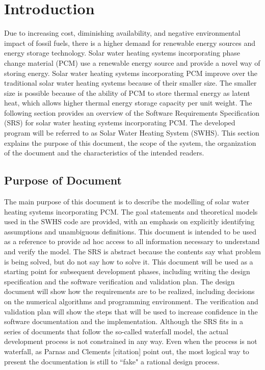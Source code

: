 \documentclass[12pt]{article}
\begin{document}
\section{Introduction}
\label{Sec:I}
Due to increasing cost, diminishing availability, and negative environmental impact of fossil fuels, there is a higher demand for renewable energy sources and energy storage technology. Solar water heating systems incorporating phase change material (PCM) use a renewable energy source and provide a novel way of storing energy. Solar water heating systems incorporating PCM improve over the traditional solar water heating systems because of their smaller size. The smaller size is possible because of the ability of PCM to store thermal energy as latent heat, which allows higher thermal energy storage capacity per unit weight.
 The following section provides an overview of the Software Requirements Specification (SRS) for solar water heating systems incorporating PCM. The developed program will be referred to as Solar Water Heating System (SWHS). This section explains the purpose of this document, the scope of the system, the organization of the document and the characteristics of the intended readers.
\subsection{Purpose of Document}
\label{Sec:PoD}
The main purpose of this document is to describe the modelling of solar water heating systems incorporating PCM. The goal statements and theoretical models used in the SWHS code are provided, with an emphasis on explicitly identifying assumptions and unambiguous definitions. This document is intended to be used as a reference to provide ad hoc access to all information necessary to understand and verify the model. The SRS is abstract because the contents say what problem is being solved, but do not say how to solve it.
This document will be used as a starting point for subsequent development phases, including writing the design specification and the software verification and validation plan. The design document will show how the requirements are to be realized, including decisions on the numerical algorithms and programming environment. The verification and validation plan will show the steps that will be used to increase confidence in the software documentation and the implementation. Although the SRS fits in a series of documents that follow the so-called waterfall model, the actual development process is not constrained in any way. Even when the process is not waterfall, as Parnas and Clements [citation] point out, the most logical way to present the documentation is still to ``fake" a rational design process.
\end{document}
